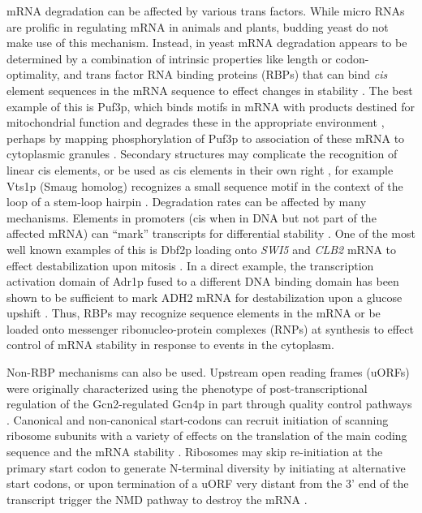 mRNA
degradation can be affected by various trans factors. While micro RNAs
are prolific in regulating mRNA in animals and plants, budding yeast
do not make use of this mechanism. Instead, in yeast mRNA degradation
appears to be determined by a combination of intrinsic properties like
length or codon-optimality, and trans factor RNA binding proteins
(RBPs) that can bind \textit{cis} element sequences in the mRNA sequence to
effect changes in stability 
\parencite{li2010predicting,cheng2017cis}. The best
example of this is Puf3p, which binds motifs in mRNA with products
destined for mitochondrial function and degrades these in the
appropriate environment 
\parencite{olivas2000puf3,miller2013carbon}, perhaps by
mapping phosphorylation of Puf3p to association of these mRNA to
cytoplasmic granules 
\parencite{lee2015glucose}. Secondary structures may
complicate the recognition of linear cis elements, or be used as cis
elements in their own right \parencite{li2010predicting},
for example Vts1p (Smaug homolog) recognizes a small sequence 
motif in the context of the loop of a stem-loop hairpin 
\parencite{she2017comprehensive,aviv2003rna}.
Degradation rates can be affected by many mechanisms. Elements in
promoters (cis when in DNA but not part of the affected mRNA) can
“mark” transcripts for differential stability 
\parencite{haimovich2013gene}.
One of the most well known examples of this is Dbf2p loading onto 
\textit{SWI5}
and \textit{CLB2} mRNA to effect destabilization upon mitosis 
\parencite{trcek2011single}. 
In a direct example, the transcription activation domain of
Adr1p fused to a different DNA binding domain has been shown to be
sufficient to mark ADH2 mRNA for destabilization upon a glucose
upshift \parencite{braun2016snf1}.
Thus, RBPs may recognize sequence
elements in the mRNA or be loaded onto messenger ribonucleo-protein
complexes (RNPs) at synthesis 
\parencite{gupta2016translational}
to effect control of
mRNA stability in response to events in the cytoplasm.  

Non-RBP
mechanisms can also be used. Upstream open reading frames (uORFs) were
originally characterized using the phenotype of post-transcriptional
regulation of the Gcn2-regulated Gcn4p 
\parencite{dever1992phosphorylation}
in part through quality control pathways 
\parencite{ruiz1996utilizing}.
Canonical and non-canonical start-codons can recruit initiation of
scanning ribosome subunits with a variety of effects on the
translation of the main coding sequence and the mRNA stability
\parencite{spealman2017conserved}. Ribosomes may skip re-initiation at the
primary start codon to generate N-terminal diversity by initiating at
alternative start codons, or upon termination of a uORF very distant
from the 3' end of the transcript trigger the NMD pathway to destroy
the mRNA \parencite{dever2016mechanism}. 

